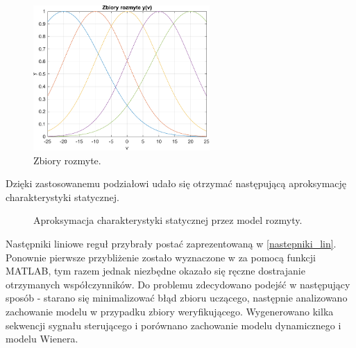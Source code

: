 \documentclass[a4paper,titlepage,11pt,floatssmall]{mwrep}
\begin{document}
\begin{figure}[h!]
\centering
\includegraphics[width=0.6\textwidth]{pictures/fuzzy_set_wien}
\caption{Zbiory rozmyte.}
\end{figure}

\newpage

\noindent Dzięki zastosowanemu podziałowi udało się otrzymać następującą aproksymację charakterystyki statycznej.

\begin{figure}[h!]
\centering
{}
\hfill
{}
\caption{Aproksymacja charakterystyki statycznej przez model rozmyty.}
\end{figure}

Następniki liniowe reguł przybrały postać zaprezentowaną w \ref{nastepniki_lin}. Ponownie pierwsze przybliżenie zostało wyznaczone w za pomocą funkcji MATLAB, tym razem jednak niezbędne okazało się ręczne dostrajanie otrzymanych współczynników. Do problemu zdecydowano podejść w następujący sposób - starano się minimalizować błąd zbioru uczącego, następnie analizowano zachowanie modelu w przypadku zbiory weryfikującego. Wygenerowano kilka sekwencji sygnału sterującego i porównano zachowanie modelu dynamicznego i modelu Wienera.
\end{document}
